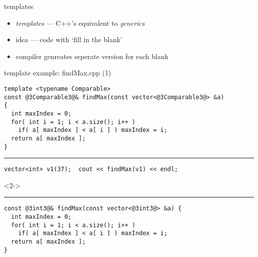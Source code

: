 \begin{frame}{templates}
    \begin{itemize}
    \item \textit{templates} --- C++'s equivalent to \textit{generics}
    \vspace{.5cm}
    \item idea --- code with `fill in the blank'
    \item compiler genreates seperate version for each blank
    \end{itemize}
\end{frame}

\begin{frame}[fragile,label=findMax]{template example: findMax.cpp (1)}
\begin{lstlisting}
template <typename Comparable>
const @3Comparable3@& findMax(const vector<@3Comparable3@> &a)
{
  int maxIndex = 0; 
  for( int i = 1; i < a.size(); i++ ) 
    if( a[ maxIndex ] < a[ i ] ) maxIndex = i; 
  return a[ maxIndex ]; 
}
\end{lstlisting}
\hrule
\begin{lstlisting}
vector<int> v1(37);  cout << findMax(v1) << endl;
\end{lstlisting}
\begin{visibleenv}<2->
\hrule
\begin{lstlisting}
const @3int3@& findMax(const vector<@3int3@> &a) {
  int maxIndex = 0; 
  for( int i = 1; i < a.size(); i++ ) 
    if( a[ maxIndex ] < a[ i ] ) maxIndex = i; 
  return a[ maxIndex ]; 
}
\end{lstlisting}
\end{visibleenv}
\end{frame}

